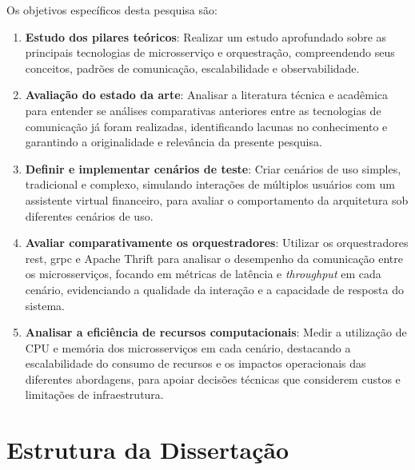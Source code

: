 Os objetivos específicos desta pesquisa são:
\begin{enumerate}
\item \textbf{Estudo dos pilares teóricos}: Realizar um estudo aprofundado sobre as principais tecnologias de microsserviço e orquestração, compreendendo seus conceitos, padrões de comunicação, escalabilidade e observabilidade.
\item \textbf{Avaliação do estado da arte}: Analisar a literatura técnica e acadêmica para entender se análises comparativas anteriores entre as tecnologias de comunicação já foram realizadas, identificando lacunas no conhecimento e garantindo a originalidade e relevância da presente pesquisa.
\item \textbf{Definir e implementar cenários de teste}: Criar cenários de uso simples, tradicional e complexo, simulando interações de múltiplos usuários com um assistente virtual financeiro, para avaliar o comportamento da arquitetura sob diferentes cenários de uso.
\item \textbf{Avaliar comparativamente os orquestradores}: Utilizar os orquestradores \gls{rest}, \gls{grpc} e Apache Thrift para analisar o desempenho da comunicação entre os microsserviços, focando em métricas de latência e \textit{throughput} em cada cenário, evidenciando a qualidade da interação e a capacidade de resposta do sistema.

\item \textbf{Analisar a eficiência de recursos computacionais}: Medir a utilização de CPU e memória dos microsserviços em cada cenário, destacando a escalabilidade do consumo de recursos e os impactos operacionais das diferentes abordagens, para apoiar decisões técnicas que considerem custos e limitações de infraestrutura.
\end{enumerate}

\section{Estrutura da Dissertação}

